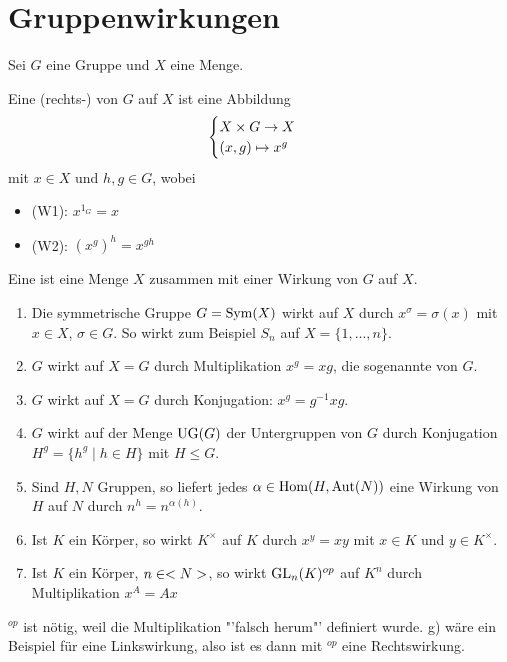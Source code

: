 \section{Gruppenwirkungen}

Sei $G$ eine Gruppe und $X$ eine Menge.

\begin{definition}
	Eine (rechts-) von $G$ auf $X$ ist eine Abbildung
	\begin{align}
		\begin{cases}
			X\times G\to X \\ (x,g)\mapsto x^g
		\end{cases}\notag
	\end{align}
	mit $x\in X$ und $h,g\in G$, wobei
	\begin{itemize}
		\item (W1): $x^{1_G}=x$
		\item (W2): $(x^g)^h=x^{gh}$
	\end{itemize}
	Eine  ist eine Menge $X$ zusammen mit einer Wirkung von $G$ auf $X$.
\end{definition}

\begin{example}
	\begin{enumerate}[label=(\alph*)]
		\item Die symmetrische Gruppe $G=\operatorname{Sym}(X)$ wirkt auf $X$ durch $x^\sigma=\sigma(x)$ mit $x\in X$, $\sigma\in G$. So wirkt zum Beispiel $S_n$ auf $X=\{1,...,n\}$.
		\item $G$ wirkt auf $X=G$ durch Multiplikation $x^g=xg$, die sogenannte  von $G$.
		\item $G$ wirkt auf $X=G$ durch Konjugation: $x^g=g^{-1}xg$.
		\item $G$ wirkt auf der Menge $\operatorname{UG}(G)$ der Untergruppen von $G$ durch Konjugation $H^g=\{h^g\mid h\in H\}$ mit $H\le G$.
		\item Sind $H,N$ Gruppen, so liefert jedes $\alpha\in\operatorname{Hom}(H,\operatorname{Aut}(N))$ eine Wirkung von $H$ auf $N$ durch $n^h=n^{\alpha(h)}$.
		\item Ist $K$ ein Körper, so wirkt $K^\times$ auf $K$ durch $x^y=xy$ mit $x\in K$ und $y\in K^\times$.
		\item Ist $K$ ein Körper, $n\in<N>$, so wirkt $\operatorname{GL}_n(K)^{op}$ auf $K^n$ durch Multiplikation $x^A=Ax$
	\end{enumerate}
\end{example}

\begin{*anmerkung}
	$^{op}$ ist nötig, weil die Multiplikation "'falsch herum"' definiert wurde. g) wäre ein Beispiel für eine Linkswirkung, also ist es dann mit $^{op}$ eine Rechtswirkung.
\end{*anmerkung}

